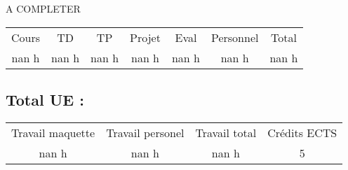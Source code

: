 %
A COMPLETER%
\begin{longtable}{c c c c c c c}%
\hline%
Cours&TD&TP&Projet&Eval&Personnel&Total\\%
nan h&nan h&nan h&nan h&nan h&nan h&nan h\\%
\hline%
\end{longtable}%
\subsection{Total UE :}%
\label{subsec:TotalUE}%

%
\begin{longtable}{c c c c}%
\hline%
Travail maquette&Travail personel&Travail total&Crédits ECTS\\%
nan h&nan h&nan h&5\\%
\hline%
\end{longtable}